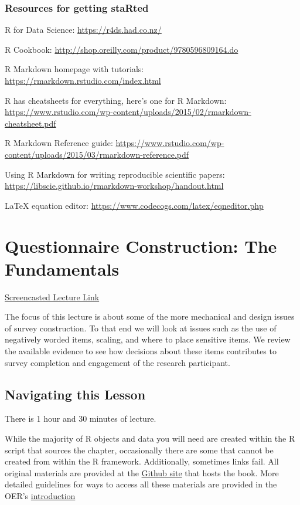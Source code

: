 \documentclass[
  english,
]{book}
\begin{document}
\hypertarget{resources-for-getting-started}{%
\subsection{Resources for getting staRted}\label{resources-for-getting-started}}

R for Data Science: \url{https://r4ds.had.co.nz/}

R Cookbook: \url{http://shop.oreilly.com/product/9780596809164.do}

R Markdown homepage with tutorials: \url{https://rmarkdown.rstudio.com/index.html}

R has cheatsheets for everything, here's one for R Markdown: \url{https://www.rstudio.com/wp-content/uploads/2015/02/rmarkdown-cheatsheet.pdf}

R Markdown Reference guide: \url{https://www.rstudio.com/wp-content/uploads/2015/03/rmarkdown-reference.pdf}

Using R Markdown for writing reproducible scientific papers: \url{https://libscie.github.io/rmarkdown-workshop/handout.html}

LaTeX equation editor: \url{https://www.codecogs.com/latex/eqneditor.php}

\hypertarget{QuestCon}{%
\chapter{Questionnaire Construction: The Fundamentals}\label{QuestCon}}

\href{https://spu.hosted.panopto.com/Panopto/Pages/Viewer.aspx?pid=becbbc0a-70b9-4fde-a256-aabb0156d460}{Screencasted Lecture Link}

The focus of this lecture is about some of the more mechanical and design issues of survey construction. To that end we will look at issues such as the use of negatively worded items, scaling, and where to place sensitive items. We review the available evidence to see how decisions about these items contributes to survey completion and engagement of the research participant.

\hypertarget{navigating-this-lesson}{%
\section{Navigating this Lesson}\label{navigating-this-lesson}}

There is 1 hour and 30 minutes of lecture.

While the majority of R objects and data you will need are created within the R script that sources the chapter, occasionally there are some that cannot be created from within the R framework. Additionally, sometimes links fail. All original materials are provided at the \href{https://github.com/lhbikos/ReC_Psychometrics}{Github site} that hosts the book. More detailed guidelines for ways to access all these materials are provided in the OER's \protect\hyperlink{ReCintro}{introduction}
\end{document}
